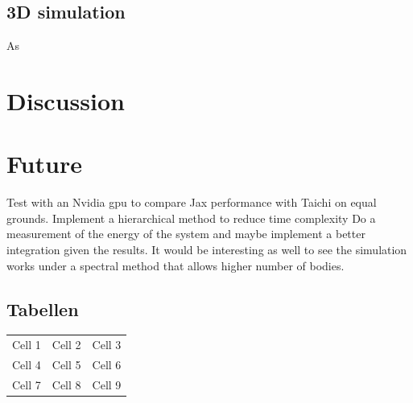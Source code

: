 \documentclass[a4paper, 11pt]{article}         %
\begin{document}
\subsection{3D simulation}
As 

\section{Discussion}

\section{Future}
Test with an Nvidia gpu to compare Jax performance with Taichi on equal grounds.
Implement a hierarchical method to reduce time complexity
Do a measurement of the energy of the system and maybe implement a better integration given the results.
It would be interesting as well to see the simulation works under a spectral method that allows higher number of bodies.


\subsection{Tabellen}                           %

\begin{center}
\begin{tabular}{ |c|c|c| } 
    \hline
    Cell 1 & Cell 2 & Cell 3 \\ 
    Cell 4 & Cell 5 & Cell 6 \\ 
    Cell 7 & Cell 8 & Cell 9 \\ 
    \hline
\end{tabular}
\end{center}



\printbibliography[heading=bibintoc]

\end{document}
